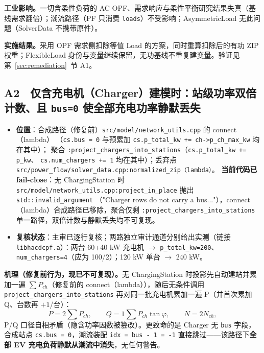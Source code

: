\documentclass[11pt,a4paper,fontset=fandol]{ctexart}
\newcommand{\file}[1]{\texttt{#1}}
\begin{document}
\textbf{工业影响。}一切含柔性负荷的 AC OPF、需求响应与柔性平衡研究结果失真（基线需求翻倍）；潮流路径（PF 只消费 \texttt{loads}）不受影响；AsymmetricLoad 无此问题（SolverData 不携带原件）。

\textbf{实施结果。}采用 OPF 需求侧扣除等值 Load 的方案，同时重算扣除后的有功 ZIP 权重；FlexibleLoad 身份与变量继续保留，无功基线不重复建变量。验证见第~\ref{sec:remediation}~节 A1。

\subsection{A2　仅含充电机（Charger）建模时：站级功率双倍计数、且 \texttt{bus=0} 使全部充电功率静默丢失}
\label{sec:a2}

\begin{itemize}
  \item \textbf{位置}：合成路径（修复前）\file{src/model/network\_utils.cpp} 的 connect（lambda）
        （\texttt{cs.bus = 0} 与预累加 \texttt{cs.p\_total\_kw += ch->p\_ch\_max\_kw} 均在其中）；
        聚合 \file{:project\_chargers\_into\_stations}（\texttt{cs.p\_total\_kw += p\_kw}、
        \texttt{cs.num\_chargers += 1} 均在其中）；丢弃点 \file{src/power\_flow/solver\_data.cpp:normalized\_zip（lambda）}。
        \textbf{当前代码已 fail-close}：无 ChargingStation 时
        \file{src/model/network\_utils.cpp:project\_in\_place} 抛出 \texttt{std::invalid\_argument}
        （"Charger rows do not carry a bus..."），connect（lambda）合成路径已移除，聚合仅剩
        \file{:project\_chargers\_into\_stations} 单一路径，双倍计数与静默丢失均不可复现。
  \item \textbf{复核状态}：主审已逐行复核；两路独立审计通道分别给出实测（链接 \file{libhacdcpf.a}）：两台 60+40 kW 充电机 $\to$ \texttt{p\_total\_kw=200}、\texttt{num\_chargers=4}（应为 100/2）；120 kW 单台 $\to$ 240 kW。
\end{itemize}

\textbf{机理（修复前行为，现已不可复现）。}无 ChargingStation 时投影先自动建站并累加一遍 $\sum P_{ch}$（修复前的 connect（lambda）），随后无条件调用 \file{project\_chargers\_into\_stations} 再对同一批充电机累加一遍 P（并首次累加 Q、台数再 $+1$/台）：
\begin{equation}
P = 2\sum P_{ch},\qquad Q = 1\sum P_{ch}\tan\varphi,\qquad N = 2N_{ch},
\end{equation}
P/Q 口径自相矛盾（隐含功率因数被篡改）。更致命的是 Charger 无 \texttt{bus} 字段，合成站点 \texttt{cs.bus = 0}，潮流装配 \texttt{idx = bus - 1 = -1} 直接跳过——该路径下\textbf{全部 EV 充电负荷静默从潮流中消失}，无任何警告。
\end{document}
